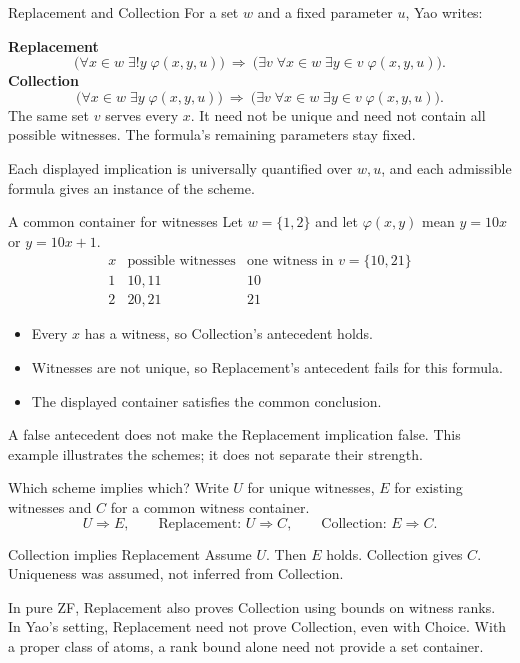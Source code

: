\documentclass[aspectratio=169,11pt]{beamer}
\begin{document}
\begin{frame}[t]{Replacement and Collection}
For a set $w$ and a fixed parameter $u$, Yao writes:
\medskip\par
\textbf{Replacement}
\[
\bigl(\forall x\in w\;\exists!y\;\varphi(x,y,u)\bigr)
\ \Longrightarrow\
\bigl(\exists v\;\forall x\in w\;\exists y\in v\;\varphi(x,y,u)\bigr).
\]
\textbf{Collection}
\[
\bigl(\forall x\in w\;\exists y\;\varphi(x,y,u)\bigr)
\ \Longrightarrow\
\bigl(\exists v\;\forall x\in w\;\exists y\in v\;\varphi(x,y,u)\bigr).
\]
The same set $v$ serves every $x$. It need not be unique and need not contain all possible witnesses. The formula's remaining parameters stay fixed.
\medskip\par
Each displayed implication is universally quantified over $w,u$, and each admissible formula gives an instance of the scheme.
\end{frame}

\begin{frame}[t]{A common container for witnesses}
Let $w=\{1,2\}$ and let $\varphi(x,y)$ mean $y=10x$ or $y=10x+1$.
\[
\begin{array}{c|c|c}
x&\text{possible witnesses}&\text{one witness in }v=\{10,21\}\\\hline
1&10,11&10\\[3pt]
2&20,21&21
\end{array}
\]
\begin{itemize}
\item Every $x$ has a witness, so Collection's antecedent holds.
\item Witnesses are not unique, so Replacement's antecedent fails for this formula.
\item The displayed container satisfies the common conclusion.
\end{itemize}
A false antecedent does not make the Replacement implication false. This example illustrates the schemes; it does not separate their strength.
\end{frame}

\begin{frame}[t]{Which scheme implies which?}
Write $U$ for unique witnesses, $E$ for existing witnesses and $C$ for a common witness container.
\[
U\Longrightarrow E,\qquad
\text{Replacement: }U\Longrightarrow C,\qquad
\text{Collection: }E\Longrightarrow C.
\]
\begin{block}{Collection implies Replacement}
Assume $U$. Then $E$ holds. Collection gives $C$.
Uniqueness was assumed, not inferred from Collection.
\end{block}
In pure ZF, Replacement also proves Collection using bounds on witness ranks.
In Yao's setting, Replacement need not prove Collection, even with Choice. With a proper class of atoms, a rank bound alone need not provide a set container.
\end{frame}
\end{document}
